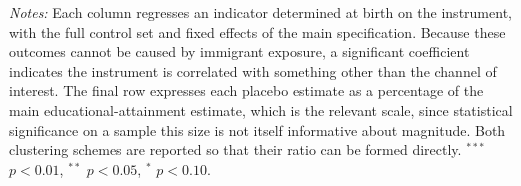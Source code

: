 \begin{table}[!htbp]
\centering
\caption{Shock-Randomization Placebo: Outcomes Determined at Birth}
\label{tab:adao_placebo}
\begin{minipage}{\textwidth}
\footnotesize
\vspace{4pt}
\textit{Notes:} Each column regresses an indicator determined at birth on the instrument, with the full control set and fixed effects of the main specification. Because these outcomes cannot be caused by immigrant exposure, a significant coefficient indicates the instrument is correlated with something other than the channel of interest. The final row expresses each placebo estimate as a percentage of the main educational-attainment estimate, which is the relevant scale, since statistical significance on a sample this size is not itself informative about magnitude. Both clustering schemes are reported so that their ratio can be formed directly. $^{***}$ $p<0.01$, $^{**}$ $p<0.05$, $^{*}$ $p<0.10$.
\end{minipage}
\end{table}

